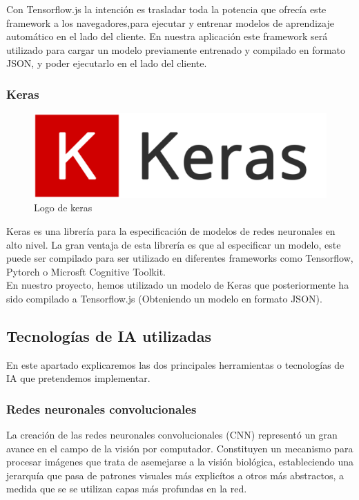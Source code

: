 \documentclass[a4paper]{article}
\begin{document}
Con Tensorflow.js la intención es trasladar toda la potencia que ofrecía este framework a los 
navegadores,para ejecutar y entrenar modelos de aprendizaje automático en el lado del cliente.
En nuestra aplicación este framework será utilizado para cargar un modelo previamente entrenado y 
compilado en formato JSON, y poder ejecutarlo en el lado del cliente. \\

\subsubsection{Keras}

\begin{figure}[ht]
    \centering
    \includegraphics[scale=0.1]{images/keras.png}
    \caption{Logo de keras}
    \label{fig:my_label}
\end{figure}

Keras es una librería para la especificación de modelos de redes neuronales en alto nivel. La gran 
ventaja de esta librería es que al especificar un modelo, este puede ser compilado para ser utilizado 
en diferentes frameworks como Tensorflow, Pytorch o Microsft Cognitive Toolkit. \\

En nuestro proyecto, hemos utilizado un modelo de Keras que posteriormente ha sido compilado a 
Tensorflow.js (Obteniendo un modelo en formato JSON).

\subsection{Tecnologías de IA utilizadas}
En este apartado explicaremos las dos principales herramientas o tecnologías de IA que pretendemos implementar.
\subsubsection{Redes neuronales convolucionales}
La creación de las redes neuronales convolucionales (CNN) representó un gran avance en el campo de la
visión por computador. Constituyen un mecanismo para procesar imágenes que trata de asemejarse a la
visión biológica, estableciendo una jerarquía que pasa de patrones visuales más explicítos a otros
más abstractos, a medida que se se utilizan capas más profundas en la red.
\end{document}
